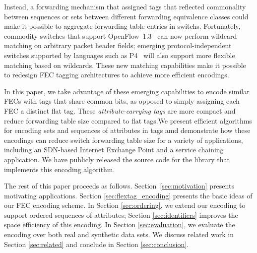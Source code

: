 Instead, a forwarding mechanism that assigned tags that reflected
commonality between sequences or sets between different forwarding
equivalence classes could make it possible to aggregate forwarding table
entries in switchs.  Fortunately, commodity switches that support
OpenFlow~1.3~\cite{of13} can now perform {wildcard} matching on arbitrary
packet 
header fields; emerging protocol-independent switches supported by
languages such as P4~\cite{P4} will also support more flexible
matching based on wildcards. These new matching capabilities make it
possible to redesign FEC tagging architectures to achieve more efficient encodings.

In this paper, we take advantage of these emerging capabilities to
encode similar FECs with tags that share common bits, as opposed to
simply assigning each FEC a distinct flat tag.  These
\emph{attribute-carrying tags} are more compact and reduce forwarding
table size compared to flat tags.We present efficient algorithms for
encoding sets and sequences of attributes in tags amd demonstrate how
these encodings can reduce switch forwarding table size for a variety of
applications, including an SDN-based Internet Exchange Point and a
service chaining application. We have publicly released the source code
for the library that implements this encoding algorithm.

The rest of this paper proceeds as follows. Section~\ref{sec:motivation}
presents motivating applications. Section \ref{sec:flextag_encoding} presents
the basic ideas of our FEC encoding scheme. In Section \ref{sec:ordering}, we
extend our encoding to support ordered sequences of attributes; Section
\ref{sec:identifiers} improves the space efficiency of this encoding. In
Section \ref{sec:evaluation}, we evaluate the encoding over both real and
synthetic data sets. We discuss related work in Section
\ref{sec:related} and conclude in Section \ref{sec:conclusion}.






%

